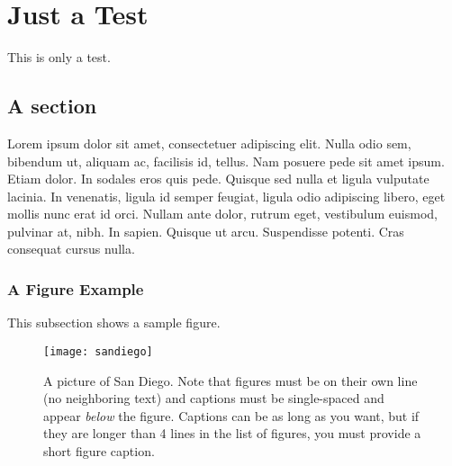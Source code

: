\documentclass[12pt,final,phd,chapterheads]{ucsd}  %
\begin{document}
%







%   
%   
%
\chapter{Just a Test}
This is only a test.
\section{A section}
Lorem ipsum dolor sit amet, consectetuer adipiscing elit. Nulla odio
sem, bibendum ut, aliquam ac, facilisis id, tellus. Nam posuere pede
sit amet ipsum. Etiam dolor. In sodales eros quis pede.  Quisque sed
nulla et ligula vulputate lacinia. In venenatis, ligula id semper
feugiat, ligula odio adipiscing libero, eget mollis nunc erat id orci.
Nullam ante dolor, rutrum eget, vestibulum euismod, pulvinar at, nibh.
In sapien. Quisque ut arcu. Suspendisse potenti. Cras consequat cursus
nulla.

\subsection{A Figure Example}
\label{ssec:figure_example}

This subsection shows a sample figure.

\begin{figure}[h] 
  \centering
  \texttt{[image: sandiego]}
  \caption[Short figure caption (must be  lines in the list of figures)]{A picture of San Diego.  Note that figures must be on their own line (no neighboring text) and captions must be single-spaced and appear \protect\textit{below} the figure.  Captions can be as long as you want, but if they are longer than 4 lines in the list of figures, you must provide a short figure caption.\protect{}} 
  \label{fig:sandiego}
\end{figure}
\end{document}
